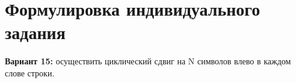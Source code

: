 \section{Формулировка индивидуального задания}

\textbf{Вариант 15:} осуществить циклический сдвиг на N символов влево в каждом слове строки.
